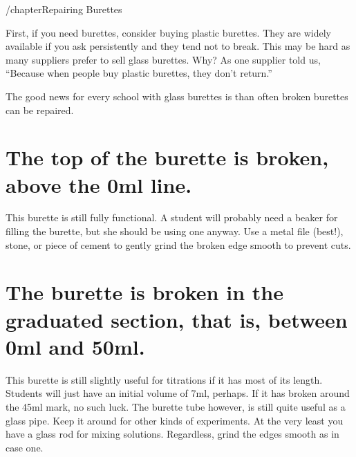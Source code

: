 /chapter{Repairing Burettes}

First, 
if you need burettes, 
consider buying plastic burettes. 
They are widely available if you ask persistently 
and they tend not to break. 
This may be hard as many suppliers prefer to sell glass burettes. 
Why? As one supplier told us, 
“Because when people buy plastic burettes, 
they don’t return.”

The good news for every school with glass burettes 
is than often broken burettes can be repaired.

\section{The top of the burette is broken, 
above the 0ml line.}

This burette is still fully functional. 
A student will probably need a beaker for filling the burette, 
but she should be using one anyway. 
Use a metal file (best!), 
stone, 
or piece of cement to gently grind the broken edge smooth to prevent cuts.

\section{The burette is broken in the graduated section, 
that is, 
between 0ml and 50ml.}
This burette is still slightly useful for titrations 
if it has most of its length. 
Students will just have an initial volume of 7ml, 
perhaps. 
If it has broken around the 45ml mark, 
no such luck. 
The burette tube however, 
is still quite useful as a glass pipe. 
Keep it around for other kinds of experiments. 
At the very least you have a glass rod for mixing solutions. 
Regardless, 
grind the edges smooth as in case one.

